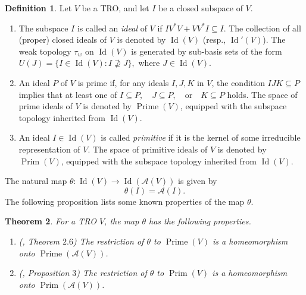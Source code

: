 \documentclass{birkjour}
\newtheorem{thm}{Theorem}[section]
\theoremstyle{definition}
\newtheorem{defn}[thm]{Definition}
\theoremstyle{remark}
\numberwithin{equation}{section}
\begin{document}
\begin{defn}
    Let $V$ be a TRO, and let $I$ be a closed subspace of $V$.

\begin{enumerate}
    \item The subspace $I$ is called an \emph{ideal} of $V$ if $IV^*V + VV^*I \subseteq I$.
The collection of all (proper) closed ideals of $V$ is denoted by $\operatorname{Id}(V)$ (resp., $\operatorname{Id}'(V)$). 
    The weak topology $\tau_w$ on $\operatorname{Id}(V)$ is generated by sub-basis sets of the form $U(J) = \{ I \in \operatorname{Id}(V) : I \not\supseteq J \},$
    where $J \in \operatorname{Id}(V)$.

    \item  An ideal \( P \) of \( V \) is prime if, for any ideals \( I, J, K \) in \( V \), the condition  
$IJK \subseteq P $  
implies that at least one of  
$I \subseteq P, \quad J \subseteq P, \quad \text{or} \quad K \subseteq P $
holds.
 The space of prime ideals of $V$ is denoted by $\operatorname{Prime}(V)$, equipped with the subspace topology inherited from $\operatorname{Id}(V)$.

    \item An ideal $I \in \operatorname{Id}(V)$ is called \emph{primitive} if it is the kernel of some irreducible representation of $V$. The space of primitive ideals of $V$ is denoted by $\operatorname{Prim}(V)$,  equipped with the subspace topology inherited from $\operatorname{Id}(V)$.
\end{enumerate}

\end{defn}





The natural map $\theta: \operatorname{Id}(V) \to \operatorname{Id}(\mathcal{A}(V)) $ is given by $$\theta(I)= \mathcal{A}(I).$$ The following proposition lists some known properties of the map $\theta$. 


\begin{thm} \label{thm2} For a TRO $V$, the map $\theta$ has the following properties. 
    \begin{enumerate}
        \item[(i)] \textit{(\cite{AAV}, Theorem $2.6$)} The restriction of $\theta$ to $\operatorname{Prime}(V)$ is a homeomorphism onto $\operatorname{Prime}(\mathcal{A}(V))$.
        \item[(ii)] \textit{(\cite{AA}, Proposition $3$)} The restriction of $\theta$ to $\operatorname{Prim}(V)$ is a homeomorphism onto $\operatorname{Prim}(\mathcal{A}(V))$. 
    \end{enumerate}
        \item 
    
\end{thm}
\end{document}
